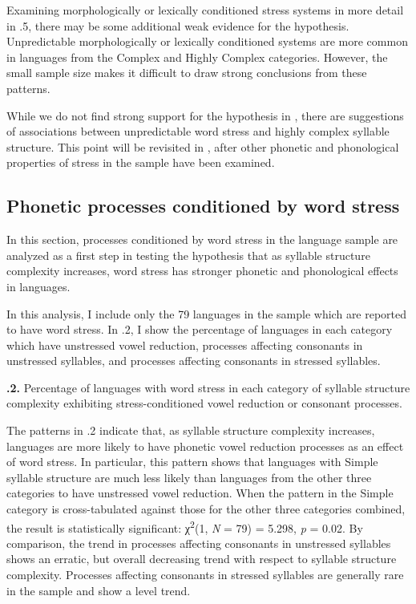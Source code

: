   Examining morphologically or lexically conditioned stress systems in more detail in .5, there may be some additional weak evidence for the hypothesis. Unpredictable morphologically or lexically conditioned systems are more common in languages from the Complex and Highly Complex categories. However, the small sample size makes it difficult to draw strong conclusions from these patterns.

  While we do not find strong support for the hypothesis in , there are suggestions of associations between unpredictable word stress and highly complex syllable structure. This point will be revisited in , after other phonetic and phonological properties of stress in the sample have been examined.

\subsection{Phonetic processes conditioned by word stress}\label{sec:5.4.3}

  In this section, processes conditioned by word stress in the language sample are analyzed as a first step in testing the hypothesis that as syllable structure complexity increases, word stress has stronger phonetic and phonological effects in languages.

  In this analysis, I include only the 79 languages in the sample which are reported to have word stress. In .2, I show the percentage of languages in each category which have unstressed vowel reduction, processes affecting consonants in unstressed syllables, and processes affecting consonants in stressed syllables.

\textbf{.2.} Percentage of languages with word stress in each category of syllable structure complexity exhibiting stress-conditioned vowel reduction or consonant processes.

  The patterns in .2 indicate that, as syllable structure complexity increases, languages are more likely to have phonetic vowel reduction processes as an effect of word stress. In particular, this pattern shows that languages with Simple syllable structure are much less likely than languages from the other three categories to have unstressed vowel reduction. When the pattern in the Simple category is cross-tabulated against those for the other three categories combined, the result is statistically significant: χ\textsuperscript{2}(1, \textit{N} = 79) = 5.298, \textit{p} = 0.02. By comparison, the trend in processes affecting consonants in unstressed syllables shows an erratic, but overall decreasing trend with respect to syllable structure complexity. Processes affecting consonants in stressed syllables are generally rare in the sample and show a level trend. 

